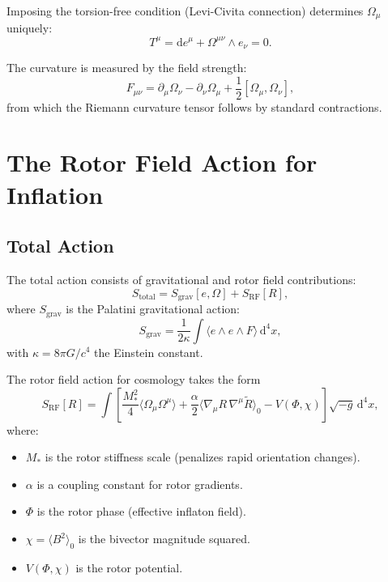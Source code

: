 \documentclass[11pt,a4paper]{article}
\numberwithin{equation}{section}
\theoremstyle{plain}
\theoremstyle{definition}
\theoremstyle{remark}
\newcommand{\dd}{\mathrm{d}}
\begin{document}
Imposing the torsion-free condition (Levi-Civita connection) determines $\Omega_\mu$ uniquely:
\begin{equation}
T^\mu = \dd e^\mu + \Omega^{\mu\nu} \wedge e_\nu = 0.
\end{equation}

The curvature is measured by the field strength:
\begin{equation}
F_{\mu\nu} = \partial_\mu \Omega_\nu - \partial_\nu \Omega_\mu + \frac{1}{2}[\Omega_\mu, \Omega_\nu],
\label{eq:curvature}
\end{equation}
from which the Riemann curvature tensor follows by standard contractions.

\section{The Rotor Field Action for Inflation}
\label{sec:action}

\subsection{Total Action}

The total action consists of gravitational and rotor field contributions:
\begin{equation}
S_{\mathrm{total}} = S_{\mathrm{grav}}[e,\Omega] + S_{\mathrm{RF}}[R],
\label{eq:total-action}
\end{equation}
where $S_{\mathrm{grav}}$ is the Palatini gravitational action:
\begin{equation}
S_{\mathrm{grav}} = \frac{1}{2\kappa} \int \langle e \wedge e \wedge F \rangle\, \dd^4x,
\end{equation}
with $\kappa = 8\pi G/c^4$ the Einstein constant.

The rotor field action for cosmology takes the form
\begin{equation}
S_{\mathrm{RF}}[R] = \int \left[\frac{M_*^2}{4}\langle \Omega_\mu \Omega^\mu \rangle + \frac{\alpha}{2}\langle \nabla_\mu R\,\nabla^\mu \widetilde{R} \rangle_0 - V(\Phi,\chi)\right] \sqrt{-g}\, \dd^4x,
\label{eq:rf-action}
\end{equation}
where:
\begin{itemize}
  \item $M_*$ is the rotor stiffness scale (penalizes rapid orientation changes).
  \item $\alpha$ is a coupling constant for rotor gradients.
  \item $\Phi$ is the rotor phase (effective inflaton field).
  \item $\chi = \langle B^2 \rangle_0$ is the bivector magnitude squared.
  \item $V(\Phi,\chi)$ is the rotor potential.
\end{itemize}
\end{document}
